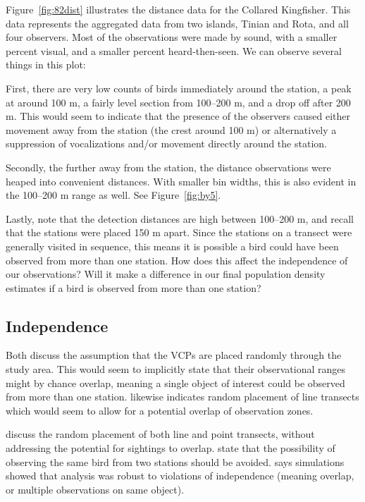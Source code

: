 \documentclass[12pt]{article}
\begin{document}
Figure~\ref{fig:82dist} illustrates the distance data for the Collared Kingfisher. This data represents the aggregated data from two islands, Tinian and Rota, and all four observers. Most of the observations were made by sound, with a smaller percent visual, and a smaller percent heard-then-seen. We can observe several things in this plot:

First, there are very low counts of birds immediately around the station, a peak at around 100 m, a fairly level section from 100--200 m, and a drop off after 200 m. This would seem to indicate that the presence of the observers caused either movement away from the station (the crest around 100 m) or alternatively a suppression of vocalizations and/or movement directly around the station. 

Secondly, the further away from the station, the distance observations were heaped into convenient distances. With smaller bin widths, this is also evident in the 100--200 m range as well. See Figure~\ref{fig:by5}.

Lastly, note that the detection distances are high between 100--200 m, and recall that the stations were placed 150 m apart. Since the stations on a transect were generally visited in sequence, this means it is possible a bird could have been observed from more than one station. How does this affect the independence of our observations? Will it make a difference in our final population density estimates if a bird is observed from more than one station?

\subsection{Independence}
Both \textcite{ramsey1979,buckland1987} discuss the assumption that the VCPs are placed randomly through the study area. This would seem to implicitly state that their observational ranges might by chance overlap, meaning a single object of interest could be observed from more than one station.  \textcite{thompson2012} likewise indicates random placement of line transects which would seem to allow for a potential overlap of observation zones. 

\textcite{buckland2001} discuss the random placement of both line and point transects, without addressing the potential for sightings to overlap. \textcite{reynolds1980} state that the possibility of observing the same bird from two stations should be avoided. \textcite{buckland2006} says simulations showed that analysis was robust to violations of independence (meaning overlap, or multiple observations on same object).
\end{document}
